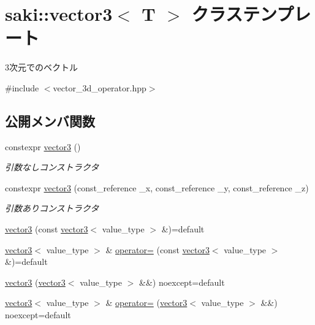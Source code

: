 \hypertarget{classsaki_1_1vector3}{}\section{saki\+:\+:vector3$<$ T $>$ クラステンプレート}
\label{classsaki_1_1vector3}


3次元でのベクトル  




{\ttfamily \#include $<$vector\+\_\+3d\+\_\+operator.\+hpp$>$}

\subsection*{公開メンバ関数}
\begin{DoxyCompactItemize}
\item 
constexpr \mbox{\hyperlink{classsaki_1_1vector3_af8c424a90ac24c595f7f9f74c74a9db3}{vector3}} ()
\begin{DoxyCompactList}\small\item\em 引数なしコンストラクタ \end{DoxyCompactList}\item 
constexpr \mbox{\hyperlink{classsaki_1_1vector3_a2ac12ac3883e0d3eced195d84268e2dc}{vector3}} (const\+\_\+reference \+\_\+x, const\+\_\+reference \+\_\+y, const\+\_\+reference \+\_\+z)
\begin{DoxyCompactList}\small\item\em 引数ありコンストラクタ \end{DoxyCompactList}\item 
\mbox{\hyperlink{classsaki_1_1vector3_aa8ab59086636c03062a54515c5d30162}{vector3}} (const \mbox{\hyperlink{classsaki_1_1vector3}{vector3}}$<$ value\+\_\+type $>$ \&)=default
\item 
\mbox{\hyperlink{classsaki_1_1vector3}{vector3}}$<$ value\+\_\+type $>$ \& \mbox{\hyperlink{classsaki_1_1vector3_a9f7a6db4eb38f4b0551c0e2250326327}{operator=}} (const \mbox{\hyperlink{classsaki_1_1vector3}{vector3}}$<$ value\+\_\+type $>$ \&)=default
\item 
\mbox{\hyperlink{classsaki_1_1vector3_a50a48aa79b10d3cdcfcd9a0a0a5801e5}{vector3}} (\mbox{\hyperlink{classsaki_1_1vector3}{vector3}}$<$ value\+\_\+type $>$ \&\&) noexcept=default
\item 
\mbox{\hyperlink{classsaki_1_1vector3}{vector3}}$<$ value\+\_\+type $>$ \& \mbox{\hyperlink{classsaki_1_1vector3_a3040b68e9d396eac595c655a8cb00c3b}{operator=}} (\mbox{\hyperlink{classsaki_1_1vector3}{vector3}}$<$ value\+\_\+type $>$ \&\&) noexcept=default

\end{DoxyCompactItemize}
